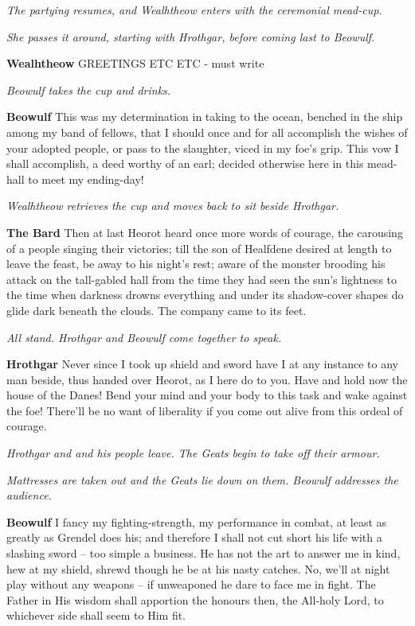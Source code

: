 \documentclass[a4paper]{article}
\begin{document}
{\centerline{\textit{The partying resumes, and Wealhtheow enters with the ceremonial mead-cup.}}
\centerline{\textit{She passes it around, starting with Hrothgar, before coming last to Beowulf.}}

\textbf{Wealhtheow} GREETINGS ETC ETC - must write

\centerline{\textit{Beowulf takes the cup and drinks.}}

\textbf{Beowulf} This was my determination in taking to the ocean,
benched in the ship among my band of fellows,
that I should once and for all accomplish the wishes
of your adopted people, or pass to the slaughter,
viced in my foe’s grip. This vow I shall accomplish,
a deed worthy of an earl; decided otherwise
here in this mead-hall to meet my ending-day!

\centerline{\textit{Wealhtheow retrieves the cup and moves back to sit beside Hrothgar.}}

\textbf{The Bard} Then at last Heorot heard once more
words of courage, the carousing of a people
singing their victories; till the son of Healfdene
desired at length to leave the feast,
be away to his night’s rest; aware of the monster
brooding his attack on the tall-gabled hall
from the time they had seen the sun’s lightness
to the time when darkness drowns everything
and under its shadow-cover shapes do glide
dark beneath the clouds. 
The company came to its feet.

\centerline{\textit{All stand. Hrothgar and Beowulf come together to speak.}}

\textbf{Hrothgar} Never since I took up shield and sword
have I at any instance to any man beside,
thus handed over Heorot, as I here do to you.
Have and hold now the house of the Danes!
Bend your mind and your body to this task
and wake against the foe! There’ll be no want of liberality
if you come out alive from this ordeal of courage.

\centerline{\textit{Hrothgar and and his people leave. The Geats begin to take off their armour.}}
\centerline{\textit{Mattresses are taken out and the Geats lie down on them. Beowulf addresses the audience.}}

\textbf{Beowulf} I fancy my fighting-strength, my performance in combat,
at least as greatly as Grendel does his;
and therefore I shall not cut short his life
with a slashing sword – too simple a business.
He has not the art to answer me in kind,
hew at my shield, shrewd though he be
at his nasty catches. No, we’ll at night play
without any weapons – if unweaponed he dare
to face me in fight. The Father in His wisdom
shall apportion the honours then, the All-holy Lord,
to whichever side shall seem to Him fit.

}
\end{document}
